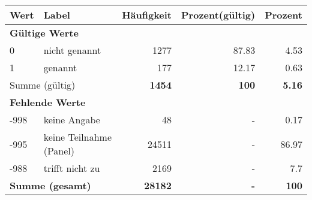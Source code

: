      \begin{longtable}{lXrrr}
     \toprule
     \textbf{Wert} & \textbf{Label} & \textbf{Häufigkeit} & \textbf{Prozent(gültig)} & \textbf{Prozent} \\
     \endhead
     \midrule
     \multicolumn{5}{l}{\textbf{Gültige Werte}}\\

     0 &
     \multicolumn{1}{X}{ nicht genannt   } &


       \num{1277} &
       \num[round-mode=places,round-precision=2]{87,83} &
         \num[round-mode=places,round-precision=2]{4,53} \\

     1 &
     \multicolumn{1}{X}{ genannt   } &


       \num{177} &
       \num[round-mode=places,round-precision=2]{12,17} &
         \num[round-mode=places,round-precision=2]{0,63} \\
     \midrule
     \multicolumn{2}{l}{Summe (gültig)} &
       \textbf{\num{1454}} &
     \textbf{100} &
       \textbf{\num[round-mode=places,round-precision=2]{5,16}} \\
     \multicolumn{5}{l}{\textbf{Fehlende Werte}}\\
       -998 &
       keine Angabe &
         \num{48} &
        - &
         \num[round-mode=places,round-precision=2]{0,17} \\
       -995 &
       keine Teilnahme (Panel) &
         \num{24511} &
        - &
         \num[round-mode=places,round-precision=2]{86,97} \\
       -988 &
       trifft nicht zu &
         \num{2169} &
        - &
         \num[round-mode=places,round-precision=2]{7,7} \\
     \midrule
     \multicolumn{2}{l}{\textbf{Summe (gesamt)}} &
          \textbf{\num{28182}} &
        \textbf{-} &
        \textbf{100} \\
     \bottomrule
     \end{longtable}
     
